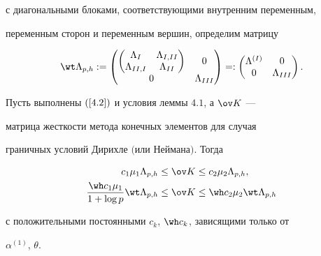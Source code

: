 с диагональными блоками, соответствующими внутренним переменным,


переменным сторон и переменным вершин, определим матрицу


\begin{equation}


\wt\Lambda_{p,h}:=


\begin{pmatrix}


\begin{pmatrix}


\Lambda_I&\Lambda_{I,II} \\


\Lambda_{II,I}&\Lambda_{II}


\end{pmatrix} & 0 \\


0&\Lambda_{III}


\end{pmatrix}


=:\begin{pmatrix}


\Lambda^{(I)}&0 \\


0&\Lambda_{III}


\end{pmatrix}.


\label{4.8}


\end{equation}





\begin{lems}


Пусть выполнены $(\ref{4.2})$ и условия леммы $4.1$, а $\ov K$ ---


матрица жесткости метода конечных элементов для случая


граничных условий Дирихле $($или Неймана$)$. Тогда


\begin{equation}


\begin{split}


c_1\mu_1\Lambda_{p,h}&\le\ov K\le c_2\mu_2\Lambda_{p,h},\\


\frac{\wh c_1\mu_1}{1+\log p}\wt\Lambda_{p,h}&\le


\ov K\le\wh c_2\mu_2\wt\Lambda_{p,h}


\label{4.9}


\end{split}


\end{equation}


с положительными постоянными $c_k$, $\wh c_k$, зависящими только от


$\alpha^{(1)}$, $\theta$.


\end{lems}





